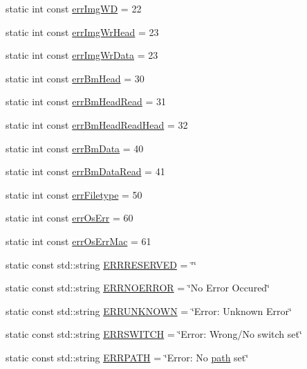 \begin{DoxyCompactItemize}
static int const \mbox{\hyperlink{classErrorHandler_afe6bbe690173284ff3f3adb889c036d8}{err\+Img\+WD}} = 22
\item 
static int const \mbox{\hyperlink{classErrorHandler_a76194049ce9812eacb553724e5c1d78c}{err\+Img\+Wr\+Head}} = 23
\item 
static int const \mbox{\hyperlink{classErrorHandler_a5f37588aedcbd44ec5b33f16dd35a01e}{err\+Img\+Wr\+Data}} = 23
\item 
static int const \mbox{\hyperlink{classErrorHandler_a9387c79594c780b28b71ec7a6adc5f8c}{err\+Bm\+Head}} = 30
\item 
static int const \mbox{\hyperlink{classErrorHandler_a8d71033ce6652f30c0ca4f0aa045a0dd}{err\+Bm\+Head\+Read}} = 31
\item 
static int const \mbox{\hyperlink{classErrorHandler_a9af29b3a10176d3e75342926bebc51bc}{err\+Bm\+Head\+Read\+Head}} = 32
\item 
static int const \mbox{\hyperlink{classErrorHandler_a0669b576bba1701445fc5e030cc23121}{err\+Bm\+Data}} = 40
\item 
static int const \mbox{\hyperlink{classErrorHandler_aa4d84bd14f132bc85fd7bccd9849b084}{err\+Bm\+Data\+Read}} = 41
\item 
static int const \mbox{\hyperlink{classErrorHandler_ae986729eee88277437cb64561249433d}{err\+Filetype}} = 50
\item 
static int const \mbox{\hyperlink{classErrorHandler_ab216b4dc48424850bdf52da2f4273023}{err\+Os\+Err}} = 60
\item 
static int const \mbox{\hyperlink{classErrorHandler_a8a55f0e95e22d240e37739a851d2fe8d}{err\+Os\+Err\+Mac}} = 61
\item 
static const std\+::string \mbox{\hyperlink{classErrorHandler_a737a712190c5e9dcbd11230bd3c2eaca}{E\+R\+R\+R\+E\+S\+E\+R\+V\+ED}} = \char`\"{}\char`\"{}
\item 
static const std\+::string \mbox{\hyperlink{classErrorHandler_ae805d5476c00a9687c15183268d4e2dd}{E\+R\+R\+N\+O\+E\+R\+R\+OR}} = \char`\"{}No Error Occured\char`\"{}
\item 
static const std\+::string \mbox{\hyperlink{classErrorHandler_a9530db091517e099bc9bad620390c31d}{E\+R\+R\+U\+N\+K\+N\+O\+WN}} = \char`\"{}Error\+: Unknown Error\char`\"{}
\item 
static const std\+::string \mbox{\hyperlink{classErrorHandler_a7d2d47caa057173f4a55e92fd62e9fb8}{E\+R\+R\+S\+W\+I\+T\+CH}} = \char`\"{}Error\+: Wrong/No switch set\char`\"{}
\item 
static const std\+::string \mbox{\hyperlink{classErrorHandler_adef43ff4191a79c860f085a59b7d6f6a}{E\+R\+R\+P\+A\+TH}} = \char`\"{}Error\+: No \mbox{\hyperlink{classErrorHandler_aeabbc987b7eaa01b6d006b55b4e00574}{path}} set\char`\"{}

\end{DoxyCompactItemize}
